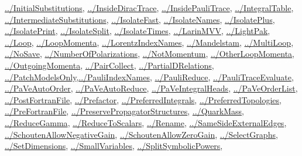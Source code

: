 \documentclass[../FeynCalcManual.tex]{subfiles}
\begin{document}
\begin{itemize}
  \hyperlink{../initialsubstitutions}{../InitialSubstitutions},
  \hyperlink{../insidediractrace}{../InsideDiracTrace},
  \hyperlink{../insidepaulitrace}{../InsidePauliTrace},
  \hyperlink{../integraltable}{../IntegralTable},
  \hyperlink{../intermediatesubstitutions}{../IntermediateSubstitutions},
  \hyperlink{../isolatefast}{../IsolateFast},
  \hyperlink{../isolatenames}{../IsolateNames},
  \hyperlink{../isolateplus}{../IsolatePlus},
  \hyperlink{../isolateprint}{../IsolatePrint},
  \hyperlink{../isolatesplit}{../IsolateSplit},
  \hyperlink{../isolatetimes}{../IsolateTimes},
  \hyperlink{../larinmvv}{../LarinMVV},
  \hyperlink{../lightpak}{../LightPak}, \hyperlink{../loop}{../Loop},
  \hyperlink{../loopmomenta}{../LoopMomenta},
  \hyperlink{../lorentzindexnames}{../LorentzIndexNames},
  \hyperlink{../mandelstam}{../Mandelstam},
  \hyperlink{../multiloop}{../MultiLoop},
  \hyperlink{../nosave}{../NoSave},
  \hyperlink{../numberofpolarizations}{../NumberOfPolarizations},
  \hyperlink{../notmomentum}{../NotMomentum},
  \hyperlink{../otherloopmomenta}{../OtherLoopMomenta},
  \hyperlink{../outgoingmomenta}{../OutgoingMomenta},
  \hyperlink{../paircollect}{../PairCollect},
  \hyperlink{../partialdrelations}{../PartialDRelations},
  \hyperlink{../patchmodelsonly}{../PatchModelsOnly},\hyperlink{../pauliindexnames}{../PauliIndexNames},
  \hyperlink{../paulireduce}{../PauliReduce},
  \hyperlink{../paulitraceevaluate}{../PauliTraceEvaluate},
  \hyperlink{../paveautoorder}{../PaVeAutoOrder},
  \hyperlink{../paveautoreduce}{../PaVeAutoReduce},
  \hyperlink{../paveintegralheads}{../PaVeIntegralHeads},
  \hyperlink{../paveorderlist}{../PaVeOrderList},
  \hyperlink{../postfortranfile}{../PostFortranFile},
  \hyperlink{../prefactor}{../Prefactor},
  \hyperlink{../preferredintegrals}{../PreferredIntegrals},
  \hyperlink{../preferredtopologies}{../PreferredTopologies},
  \hyperlink{../prefortranfile}{../PreFortranFile},
  \hyperlink{../preservepropagatorstructures}{../PreservePropagatorStructures},
  \hyperlink{../quarkmass}{../QuarkMass},
  \hyperlink{../reducegamma}{../ReduceGamma},
  \hyperlink{../reducetoscalars}{../ReduceToScalars},
  \hyperlink{../rename}{../Rename},
  \hyperlink{../samesideexternaledges}{../SameSideExternalEdges},
  \hyperlink{../schoutenallownegativegain}{../SchoutenAllowNegativeGain},
  \hyperlink{../schoutenallowzerogain}{../SchoutenAllowZeroGain},
  \hyperlink{../selectgraphs}{../SelectGraphs},
  \hyperlink{../setdimensions}{../SetDimensions},
  \hyperlink{../smallvariables}{../SmallVariables},
  \hyperlink{../splitsymbolicpowers}{../SplitSymbolicPowers},

\end{itemize}
\end{document}

